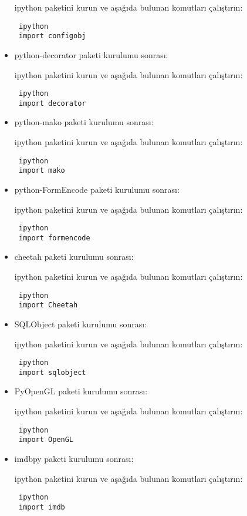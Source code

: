 \documentclass[a4paper,10pt]{article}
\begin{document}
\begin{itemize}
ipython paketini kurun ve aşağıda bulunan komutları çalıştırın:
\begin{verbatim}
 ipython
 import configobj
\end{verbatim}
\item python-decorator paketi kurulumu sonrası:

ipython paketini kurun ve aşağıda bulunan komutları çalıştırın:
\begin{verbatim}
 ipython
 import decorator
\end{verbatim}
\item python-mako paketi kurulumu sonrası:

ipython paketini kurun ve aşağıda bulunan komutları çalıştırın:
\begin{verbatim}
 ipython
 import mako
\end{verbatim}

\item python-FormEncode paketi kurulumu sonrası:

ipython paketini kurun ve aşağıda bulunan komutları çalıştırın:
\begin{verbatim}
 ipython
 import formencode
\end{verbatim}

\item cheetah  paketi kurulumu sonrası:

ipython paketini kurun ve aşağıda bulunan komutları çalıştırın:
\begin{verbatim}
 ipython
 import Cheetah
\end{verbatim}


\item SQLObject  paketi kurulumu sonrası:

ipython paketini kurun ve aşağıda bulunan komutları çalıştırın:
\begin{verbatim}
 ipython
 import sqlobject
\end{verbatim}

\item PyOpenGL  paketi kurulumu sonrası:

ipython paketini kurun ve aşağıda bulunan komutları çalıştırın:
\begin{verbatim}
 ipython
 import OpenGL
\end{verbatim}

\item imdbpy  paketi kurulumu sonrası:

ipython paketini kurun ve aşağıda bulunan komutları çalıştırın:
\begin{verbatim}
 ipython
 import imdb
\end{verbatim}


\end{itemize}
\end{document}
